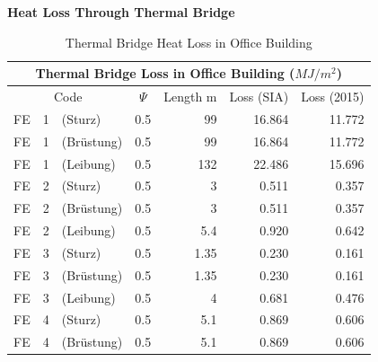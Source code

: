 \documentclass[11pt, a4paper]{article}
\theoremstyle{definition}
\begin{document}
		\textbf{Heat Loss Through Thermal Bridge}\\

\begin{table}[H]
\centering
\small
\caption{Thermal Bridge Heat Loss in Office Building}
    \begin{tabular}{ccccrrr}
    \toprule
    \multicolumn{7}{c}{Thermal Bridge Loss in Office Building ($MJ/m^2$)} \\
    \hline
    \multicolumn{3}{c}{Code} & \multicolumn{1}{p{2.785em}}{$\Psi$} & \multicolumn{1}{c}{Length\newline{} m} & \multicolumn{1}{p{3em}}{Loss (SIA)} & \multicolumn{1}{p{3em}}{Loss (2015)} \\
    \multicolumn{1}{l}{FE} & \multicolumn{1}{r}{1} & \multicolumn{1}{l}{(Sturz)} & \multicolumn{1}{r}{0.5} & 99   & 16.864 & 11.772 \\
    \multicolumn{1}{l}{FE} & \multicolumn{1}{r}{1} & \multicolumn{1}{l}{(Brüstung)} & \multicolumn{1}{r}{0.5} & 99   & 16.864 & 11.772 \\
    \multicolumn{1}{l}{FE} & \multicolumn{1}{r}{1} & \multicolumn{1}{l}{(Leibung)} & \multicolumn{1}{r}{0.5} & 132  & 22.486 & 15.696 \\
    \multicolumn{1}{l}{FE} & \multicolumn{1}{r}{2} & \multicolumn{1}{l}{(Sturz)} & \multicolumn{1}{r}{0.5} & 3    & 0.511 & 0.357 \\
    \multicolumn{1}{l}{FE} & \multicolumn{1}{r}{2} & \multicolumn{1}{l}{(Brüstung)} & \multicolumn{1}{r}{0.5} & 3    & 0.511 & 0.357 \\
    \multicolumn{1}{l}{FE} & \multicolumn{1}{r}{2} & \multicolumn{1}{l}{(Leibung)} & \multicolumn{1}{r}{0.5} & 5.4  & 0.920 & 0.642 \\
    \multicolumn{1}{l}{FE} & \multicolumn{1}{r}{3} & \multicolumn{1}{l}{(Sturz)} & \multicolumn{1}{r}{0.5} & 1.35 & 0.230 & 0.161 \\
    \multicolumn{1}{l}{FE} & \multicolumn{1}{r}{3} & \multicolumn{1}{l}{(Brüstung)} & \multicolumn{1}{r}{0.5} & 1.35 & 0.230 & 0.161 \\
    \multicolumn{1}{l}{FE} & \multicolumn{1}{r}{3} & \multicolumn{1}{l}{(Leibung)} & \multicolumn{1}{r}{0.5} & 4    & 0.681 & 0.476 \\
    \multicolumn{1}{l}{FE} & \multicolumn{1}{r}{4} & \multicolumn{1}{l}{(Sturz)} & \multicolumn{1}{r}{0.5} & 5.1  & 0.869 & 0.606 \\
    \multicolumn{1}{l}{FE} & \multicolumn{1}{r}{4} & \multicolumn{1}{l}{(Brüstung)} & \multicolumn{1}{r}{0.5} & 5.1  & 0.869 & 0.606 \\

\end{tabular}
\end{table}
\end{document}
